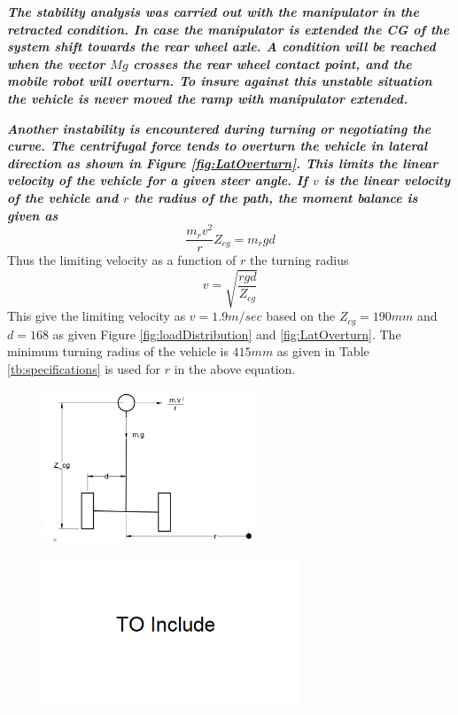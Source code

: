 \textbf{\textit{The stability analysis was carried out with the manipulator in the retracted condition. In case the manipulator is extended  the CG of the system shift towards the rear wheel axle. A condition will be reached when the vector $Mg$ crosses the rear wheel contact point, and the mobile robot will overturn. To insure against this unstable situation the vehicle is never moved the ramp with manipulator extended.}} 
   
\textbf{\textit{Another instability is encountered during turning or negotiating the curve. The centrifugal force tends to overturn the vehicle in lateral direction as shown in Figure \ref{fig:LatOverturn}. This limits the linear velocity of the vehicle for a given steer angle. If $v$ is the linear velocity of the vehicle and $r$ the radius of the path, the moment balance is given as}}
\begin{equation}
\label{eqn:LatOverturn}
\frac{m_r v^2}{r}Z_{cg}=m_r g d 
\end{equation}
Thus the limiting velocity as a function of $r$ the turning radius
\begin{equation}
\label{eqn:Vel_limit}
v=\sqrt{\frac{rg d}{Z_{cg}}}
\end{equation}
This give the limiting velocity as $v=1.9m/sec$ based on the $Z_{cg}=190mm$ and $d=168$ as given Figure \ref{fig:loadDistribution} and \ref{fig:LatOverturn}. The minimum turning radius of the vehicle is $415mm$ as given in Table \ref{tb:specifications} is used for $r$ in the above equation.

\begin{figure}
 	\centering
 	\begin{minipage}{.5\textwidth}
 		\centering
 		\includegraphics[width=.9\linewidth,height=4.5cm,keepaspectratio]{Chapter3/fig/LateralOverturn}
 		\label{fig:LatOverturn}
 	\end{minipage}%
 	\begin{minipage}{.5\textwidth}
 		\centering
 		\includegraphics[height=4.5cm,keepaspectratio]{Chapter3/fig/xxx}
 		\label{fig:xxx}
 	\end{minipage}
 \end{figure}

